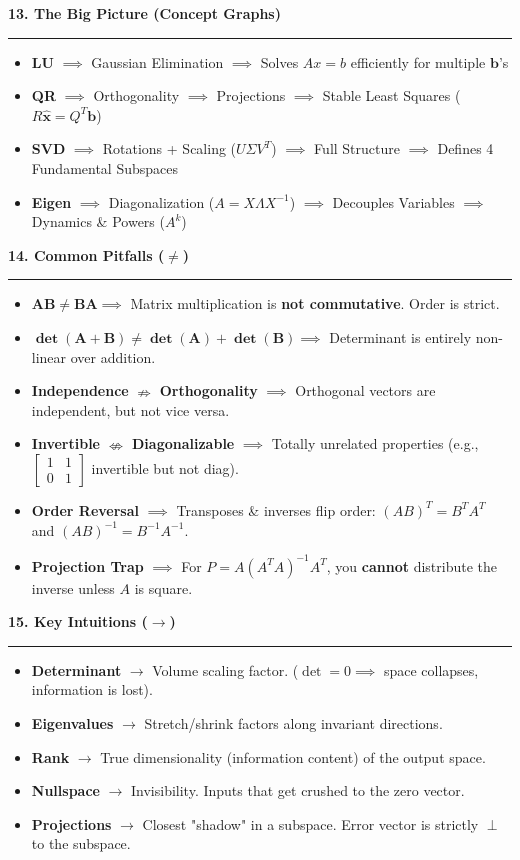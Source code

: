\documentclass[10pt, landscape, twocolumn]{article}
\newcommand{\cheatsheetsection}[1]{
    \vspace{0.6em}
    {\color{themeblue}\large\bfseries #1} \par
    \vspace{-0.5em}
    {\color{themeblue}\rule{\linewidth}{1pt}} \par
    \vspace{0.2em}
}
\begin{document}
\cheatsheetsection{13. The Big Picture (Concept Graphs)}
\begin{itemize}[leftmargin=*, itemsep=4pt, parsep=0pt]
    \item \textbf{LU} $\implies$ Gaussian Elimination $\implies$ Solves $Ax=b$ efficiently for multiple $\mathbf{b}$'s
    \item \textbf{QR} $\implies$ Orthogonality $\implies$ Projections $\implies$ Stable Least Squares ($R\hat{\mathbf{x}} = Q^T\mathbf{b}$)
    \item \textbf{SVD} $\implies$ Rotations + Scaling ($U\Sigma V^T$) $\implies$ Full Structure $\implies$ Defines 4 Fundamental Subspaces
    \item \textbf{Eigen} $\implies$ Diagonalization ($A=X\Lambda X^{-1}$) $\implies$ Decouples Variables $\implies$ Dynamics \& Powers ($A^k$)
\end{itemize}

\cheatsheetsection{14. 
Common Pitfalls ($\neq$)}
\begin{itemize}[leftmargin=*, itemsep=4pt, parsep=0pt]
    \item $\mathbf{AB \neq BA} \implies$ Matrix multiplication is \textbf{not commutative}. Order is strict.
    \item $\mathbf{\det(A+B) \neq \det(A) + \det(B)} \implies$ Determinant is entirely non-linear over addition.
    \item \textbf{Independence} $\mathbf{\nRightarrow}$ \textbf{Orthogonality} $\implies$ Orthogonal vectors are independent, but not vice versa.
    \item \textbf{Invertible} $\mathbf{\nLeftrightarrow}$ \textbf{Diagonalizable} $\implies$ Totally unrelated properties (e.g., $\left[\begin{smallmatrix}1&1\\0&1\end{smallmatrix}\right]$ invertible but not diag).
    \item \textbf{Order Reversal} $\implies$ Transposes \& inverses flip order: $(AB)^T = B^T A^T$ and $(AB)^{-1} = B^{-1} A^{-1}$.
    \item \textbf{Projection Trap} $\implies$ For $P = A(A^TA)^{-1}A^T$, you \textbf{cannot} distribute the inverse unless $A$ is square.
\end{itemize}

\cheatsheetsection{15. Key Intuitions ($\to$)}
\begin{itemize}[leftmargin=*, itemsep=4pt, parsep=0pt]
    \item \textbf{Determinant} $\to$ Volume scaling factor. ($\det=0 \implies$ space collapses, information is lost).
    \item \textbf{Eigenvalues} $\to$ Stretch/shrink factors along invariant directions.
    \item \textbf{Rank} $\to$ True dimensionality (information content) of the output space.
    \item \textbf{Nullspace} $\to$ Invisibility. Inputs that get crushed to the zero vector.
    \item \textbf{Projections} $\to$ Closest "shadow" in a subspace. Error vector is strictly $\perp$ to the subspace.
\end{itemize}
\end{document}

